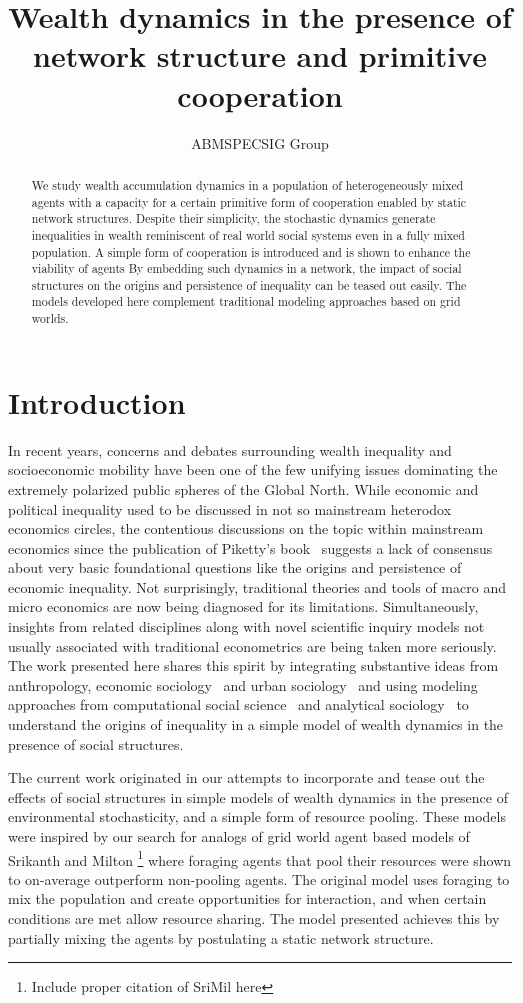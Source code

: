\documentclass{article}
\author{ABMSPECSIG Group}
\title{Wealth dynamics in the presence of network structure and primitive cooperation}
\begin{document}
\maketitle
\begin{abstract}
We study wealth accumulation dynamics in a population of heterogeneously mixed agents with a capacity for a certain primitive form of cooperation enabled by static network structures. Despite their simplicity, the stochastic dynamics generate inequalities in wealth reminiscent of real world social systems even in a fully mixed population. A simple form of cooperation is introduced and is shown to enhance the viability of agents By embedding such dynamics in a network, the impact of social structures on the origins and persistence of inequality can be teased out easily. The models developed here complement traditional modeling approaches based on grid worlds.   

\end{abstract}
\section{Introduction}
In recent years, concerns and debates surrounding wealth inequality and socioeconomic mobility have been one of the few unifying issues dominating the extremely polarized public spheres of the Global North. While economic and political inequality used to be discussed in not so mainstream heterodox economics circles, the contentious discussions on the topic within mainstream economics since the publication of Piketty's book~\cite{piketty2017capital} suggests a lack of consensus about very basic foundational questions like the origins and persistence of economic inequality. Not surprisingly, traditional theories and tools of macro and micro economics are now being diagnosed for its limitations. Simultaneously, insights from related disciplines along with novel scientific inquiry models not usually associated with traditional econometrics are being taken more seriously. The work presented here shares this spirit by integrating substantive ideas from anthropology, economic sociology~\cite{granovetter2017society} and urban sociology~\cite{sampson2012great} and using modeling approaches from computational social science~\cite{hedstrom2018} and analytical sociology~\cite{hedstrom2011oxford} to understand the origins of inequality in a simple model of wealth dynamics in the presence of social structures.    

The current work originated in our attempts to incorporate and tease out the effects of social structures in simple models of wealth dynamics in the presence of environmental stochasticity, and a simple form of resource pooling. These models were inspired by our search for analogs of grid world agent based models of Srikanth and Milton \footnote{Include proper citation of SriMil here} where foraging agents that pool their resources were shown to on-average outperform non-pooling agents. The original model uses foraging to mix the population and create opportunities for interaction, and when certain conditions are met allow resource sharing. The model presented achieves this by partially mixing the agents by postulating a static network structure. 
\end{document}

